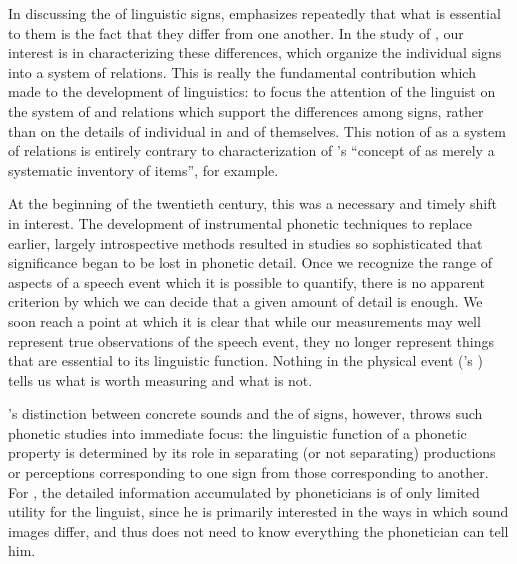 In discussing the \emph{} of linguistic signs, {\Saussure}
emphasizes repeatedly that what is essential to them is the fact that
they differ from one another. In the study of \emph{}, our
interest is in characterizing these differences, which organize the
individual signs into a system of relations. This is really the
fundamental contribution which {\Saussure} made to the development of
linguistics: to focus the attention of the linguist on the system of
 and relations which support the differences among signs,
rather than on the details of individual  in and of
themselves. This notion of \emph{} as a system of relations is
entirely contrary to  characterization of
{\Saussure}'s ``{concept} of \emph{} as merely a systematic inventory
of items'', for example.

At the beginning of the twentieth century, this was a necessary and
timely shift in interest. The development of instrumental phonetic
techniques to replace earlier, largely introspective methods resulted
in studies so sophisticated that significance began to be lost in
phonetic detail. Once we recognize the range of aspects of a speech
event which it is possible to quantify, there is no apparent criterion
by which we can decide that a given amount of detail is enough. We
soon reach a point at which it is clear that while our measurements
may well represent true observations of the speech event, they no
longer represent things that are essential to its linguistic
function. Nothing in the physical event ({\Saussure}'s ) tells us
what is worth measuring and what is not.

{\Saussure}'s distinction between concrete sounds and the
\emph{} of signs, however, throws such phonetic studies
into immediate focus: the linguistic function of a phonetic property
is determined by its role in separating (or not separating)
productions or perceptions corresponding to one sign from those
corresponding to another. For {\Saussure}, the detailed information
accumulated by phoneticians is of only limited utility for the
linguist, since he is primarily interested in the ways in which sound
images differ, and thus does not need to know everything the
phonetician can tell him.


